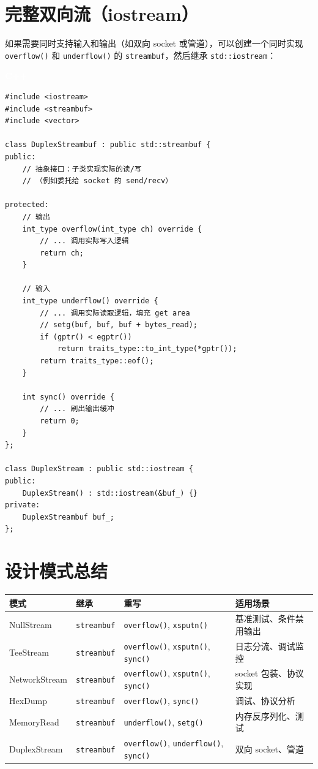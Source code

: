 \documentclass[12pt,a4paper,fontset=fandol]{ctexbook}
\newcommand{\Fn}[1]{\texttt{#1()}}
\newcommand{\Tp}[1]{\texttt{#1}}
\newcommand{\cpplabel}{%
  \noindent\begin{tcolorbox}[sharp corners,colback=algheadbg,colframe=algheadbg,
    left=6pt,right=6pt,top=2pt,bottom=2pt,boxrule=0pt]
  \textcolor{white}{\small\bfseries\sffamily C++}\end{tcolorbox}%
}
\begin{document}
\section{完整双向流（iostream）}

如果需要同时支持输入和输出（如双向 socket 或管道），可以创建一个同时实现 \Fn{overflow} 和 \Fn{underflow} 的 \Tp{streambuf}，然后继承 \Tp{std::iostream}：

\cpplabel
\begin{lstlisting}
#include <iostream>
#include <streambuf>
#include <vector>

class DuplexStreambuf : public std::streambuf {
public:
    // 抽象接口：子类实现实际的读/写
    // （例如委托给 socket 的 send/recv）

protected:
    // 输出
    int_type overflow(int_type ch) override {
        // ... 调用实际写入逻辑
        return ch;
    }

    // 输入
    int_type underflow() override {
        // ... 调用实际读取逻辑，填充 get area
        // setg(buf, buf, buf + bytes_read);
        if (gptr() < egptr())
            return traits_type::to_int_type(*gptr());
        return traits_type::eof();
    }

    int sync() override {
        // ... 刷出输出缓冲
        return 0;
    }
};

class DuplexStream : public std::iostream {
public:
    DuplexStream() : std::iostream(&buf_) {}
private:
    DuplexStreambuf buf_;
};
\end{lstlisting}

\section{设计模式总结}

\begin{compare}[title=自定义流设计模式]
\begin{tabularx}{\textwidth}{l>{\raggedright\arraybackslash}X>{\raggedright\arraybackslash}X>{\raggedright\arraybackslash}X}
\toprule
\textbf{模式} & \textbf{继承} & \textbf{重写} & \textbf{适用场景} \\
\midrule
NullStream & \Tp{streambuf} & \Fn{overflow}, \Fn{xsputn} & 基准测试、条件禁用输出 \\
TeeStream & \Tp{streambuf} & \Fn{overflow}, \Fn{xsputn}, \Fn{sync} & 日志分流、调试监控 \\
NetworkStream & \Tp{streambuf} & \Fn{overflow}, \Fn{xsputn}, \Fn{sync} & socket 包装、协议实现 \\
HexDump & \Tp{streambuf} & \Fn{overflow}, \Fn{sync} & 调试、协议分析 \\
MemoryRead & \Tp{streambuf} & \Fn{underflow}, \Fn{setg} & 内存反序列化、测试 \\
DuplexStream & \Tp{streambuf} & \Fn{overflow}, \Fn{underflow}, \Fn{sync} & 双向 socket、管道 \\
\bottomrule
\end{tabularx}
\end{compare}
\end{document}
